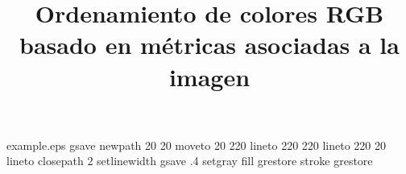 %
%
%
%
%
\begin{filecontents*}{example.eps}
gsave
newpath
  20 20 moveto
  20 220 lineto
  220 220 lineto
  220 20 lineto
closepath
2 setlinewidth
gsave
  .4 setgray fill
grestore
stroke
grestore
\end{filecontents*}
%
\documentclass[twocolumn,fleqn]{svjour3}
%
\smartqed  %
%
\usepackage[numbers]{natbib}
\usepackage{amssymb}
\usepackage{amsmath}
\usepackage{textcomp}
\usepackage[T1]{fontenc}
\usepackage[utf8]{inputenc}
\usepackage[spanish]{babel}
\usepackage{csquotes}
\usepackage{enumerate}
\usepackage{enumitem}
\usepackage{caption}
\captionsetup{compatibility=false}
\usepackage{subcaption}
\usepackage{listings}
\usepackage{array} %
\usepackage{multirow} %
\usepackage{nicefrac} %
\usepackage[dvipsnames]{xcolor}
\usepackage{pgfplots}
\pgfplotsset{compat=default}
\usepackage{pgfplotstable}
\usetikzlibrary{spy}
\usepackage{longtable}
\usepackage{array}
\usepackage{pdflscape}
\usepackage{booktabs}



%
%
%
%
\journalname{}


%


\title{Ordenamiento de colores RGB basado en m\'etricas asociadas a la imagen  %
}

